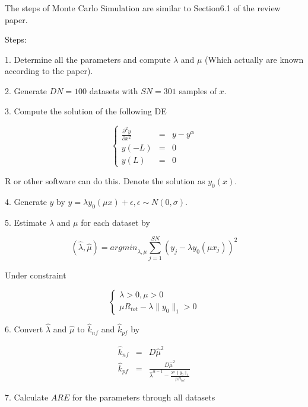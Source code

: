 \documentclass[12pt]{extarticle}
\begin{document}
The steps of Monte Carlo Simulation are similar to Section6.1 of the review paper.

Steps:

1. Determine all the parameters and compute $\lambda$ and $\mu$ (Which actually are known according to the paper).

2. Generate $DN=100$ datasets with $SN=301$ samples of $x$.

3. Compute the solution of the following DE

\begin{equation*}
\left\{
\begin{array}{rcl}
\frac{\partial^{2}y}{\partial{}x^{2}} & = & y-y^{\alpha} \\
y(-L) & = & 0 \\
y(L) & = & 0
\end{array}\right.
\end{equation*}

R or other software can do this. Denote the solution as $y_{0}(x)$.

4. Generate $y$ by $y=\lambda{}y_{0}(\mu{}x)+\epsilon{}, \epsilon{}\sim{}N(0,\sigma{})$.

5. Estimate $\lambda$ and $\mu$ for each dataset by 

\begin{equation*}
(\hat{\lambda},\hat{\mu})={argmin}_{\lambda,\mu}\sum_{j=1}^{SN}\left(y_{j}-\lambda{}y_{0}(\mu{}x_{j})\right)^2
\end{equation*}

Under constraint

\begin{equation*}
\left\{
\begin{array}{l}
\lambda>0, \mu>0 \\
\mu{}R_{tot}-\lambda{}\|y_{0}\|_{1}>0
\end{array}
\right.
\end{equation*}

6. Convert $\hat{\lambda}$ and $\hat{\mu}$ to $\hat{k}_{nf}$ and $\hat{k}_{pf}$ by

\begin{equation*}
\begin{array}{rcl}
\hat{k}_{nf} & = & D\hat{\mu}^2 \\
\hat{k}_{pf} & = & \frac{D\hat{\mu}^{2}}{\hat{\lambda}^{\alpha-1}-\frac{\lambda{}^{\alpha}\|y_{0}\|_{1}}{\hat{\mu}R_{tot}}}
\end{array}
\end{equation*}

7. Calculate $ARE$ for the parameters through all datasets
\end{document}
